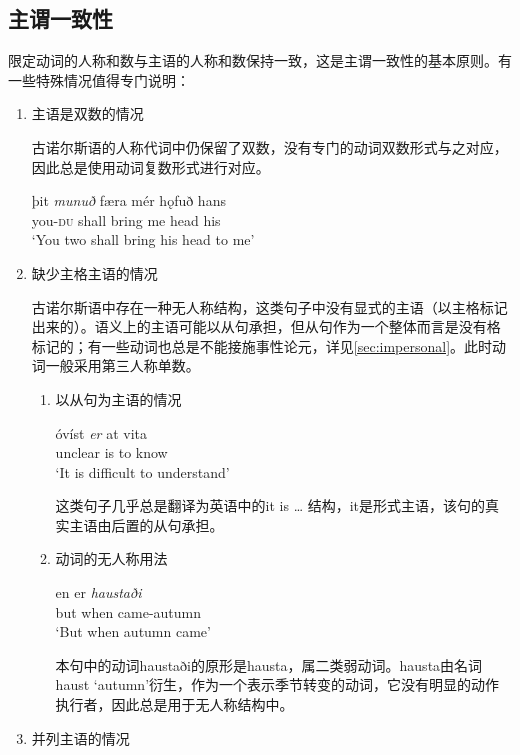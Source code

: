\subsection{主谓一致性}
\label{sec:SVagreement}
限定动词的人称和数与主语的人称和数保持一致，这是主谓一致性的基本原则。有一些特殊情况值得专门说明：
\begin{enumerate}
\setlength{\parindent}{2em}
    \item 主语是双数的情况
    
    古诺尔斯语的人称代词中仍保留了双数，没有专门的动词双数形式与之对应，因此总是使用动词复数形式进行对应。
    \begin{exe}
    \ex
    \gll þit	\textit{munuð}	færa	mér	hǫfuð	hans\\
you-\textsc{du}	shall	bring	me	head	his\\
\trans `You two shall bring his head to me’
    \end{exe}

    \item 缺少主格主语的情况
    
古诺尔斯语中存在一种无人称结构，这类句子中没有显式的主语（以主格标记出来的）。语义上的主语可能以从句承担，但从句作为一个整体而言是没有格标记的；有一些动词也总是不能接施事性论元，详见\ref{sec:impersonal}。此时动词一般采用第三人称单数。
\begin{enumerate}
\setlength{\parindent}{2em}
    \item 以从句为主语的情况
    \begin{exe}
        \ex
        \gll óvíst	\textit{er}	at	vita\\
unclear	is	to	know\\
\trans `It is difficult to understand’
    \end{exe}
这类句子几乎总是翻译为英语中的it is … 结构，it是形式主语，该句的真实主语由后置的从句承担。
\item 动词的无人称用法
\begin{exe}
    \ex
    \gll en	er	\textit{haustaði}\\
but	when	came-autumn\\
    \trans `But when autumn came’
\end{exe}

本句中的动词haustaði的原形是hausta，属二类弱动词。hausta由名词haust `autumn’衍生，作为一个表示季节转变的动词，它没有明显的动作执行者，因此总是用于无人称结构中。
\end{enumerate}

\item 并列主语的情况


\end{enumerate}
